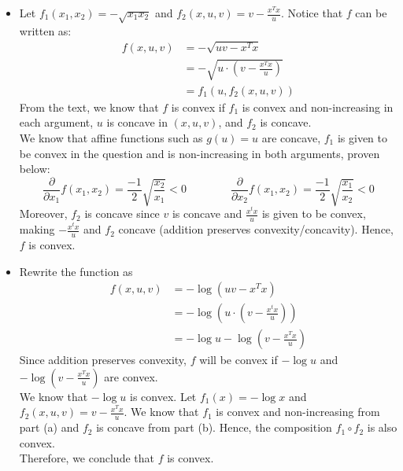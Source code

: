 \documentclass{article}
\begin{document}
\begin{itemize}
\begin{itemize}
\begin{align*}
      f_1'(x) &= \frac{d}{dx} (-\log x) \\
      &= -1/x \\
      \Rightarrow f_1'(x) &< 0 \quad \forall x \in \mathbb{R}_{++}
    \end{align*}
    Therefore, $f_1$ is non-increasing. Hence, we conclude that $f$ is convex.
    \item[(b)] Let $f_1(x_1, x_2) = -\sqrt{x_1x_2}$ and $f_2(x, u, v) = v - \frac{x^Tx}{u}$. Notice that $f$ can be written as:
    \begin{align*}
      f(x, u, v) &= -\sqrt{uv - x^Tx} \\
      &= -\sqrt{u \cdot \left(v - \frac{x^Tx}{u}\right)} \\
      &= f_1(u, f_2(x, u, v))
    \end{align*}
    From the text, we know that $f$ is convex if $f_1$ is convex and non-increasing in each argument, $u$ is concave in $(x, u, v)$, and $f_2$ is concave. \\
    We know that affine functions such as $g(u) = u$ are concave, $f_1$ is given to be convex in the question and is non-increasing in both arguments, proven below:
    \[ \frac{\partial}{\partial x_1} f(x_1, x_2) = \frac{-1}{2}\sqrt{\frac{x_2}{x_1}} < 0
    \qquad \qquad
    \frac{\partial}{\partial x_2} f(x_1, x_2) = \frac{-1}{2}\sqrt{\frac{x_1}{x_2}} < 0 \]
    Moreover, $f_2$ is concave since $v$ is concave and $\frac{x^tx}{u}$ is given to be convex, making $-\frac{x^tx}{u}$ and $f_2$ concave (addition preserves convexity/concavity). Hence, $f$ is convex.
    \item[(c)] Rewrite the function as
    \begin{align*}
      f(x, u, v) &= -\log(uv - x^Tx) \\
      &= -\log\left(u \cdot \left(v - \frac{x^tx}{u}\right)\right) \\
      &= -\log u - \log\left(v - \frac{x^Tx}{u}\right)
    \end{align*}
    Since addition preserves convexity, $f$ will be convex if $-\log u$ and $-\log\left(v-\frac{x^Tx}{u}\right)$ are convex. \\
    We know that $-\log u$ is convex.
    Let $f_1(x) = -\log x$ and $f_2(x, u, v) = v - \frac{x^Tx}{u}$. We know that $f_1$ is convex and non-increasing from part (a) and $f_2$ is concave from part (b). Hence, the composition $f_1 \circ f_2$ is also convex. \\
    Therefore, we conclude that $f$ is convex.
  \end{itemize}


\end{itemize}
\end{document}
